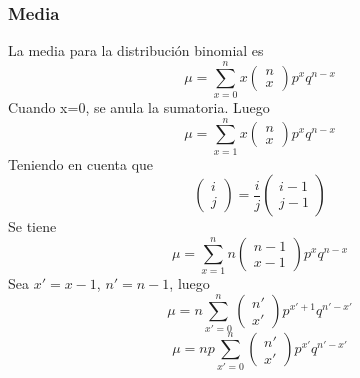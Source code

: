 \documentclass[12pt]{article}
\begin{document}
            \subsubsection{Media}
            	La media para la distribución binomial es	
                \begin{equation*}
                	\mu =\sum _{ x=0 }^{ n }{ x\left( \begin{matrix} n \\ x \end{matrix} \right) { p }^{ x }{ q }^{ n-x } } 
                \end{equation*}
                Cuando x=0, se anula la sumatoria. Luego
                \begin{equation*}
                	\mu =\sum _{ x=1 }^{ n }{ x\left( \begin{matrix} n \\ x \end{matrix} \right) { p }^{ x }{ q }^{ n-x } } 
                \end{equation*}
                Teniendo en cuenta que
                \begin{equation*}
                	\left( \begin{matrix} i \\ j \end{matrix} \right) =\frac { i }{ j } \left( \begin{matrix} i-1 \\ j-1 \end{matrix} \right) 
                \end{equation*}
                Se tiene
                \begin{equation*}
                	\mu =\sum _{ x=1 }^{ n }{ n\left( \begin{matrix} n-1 \\ x-1 \end{matrix} \right) { p }^{ x }{ q }^{ n-x } }
                \end{equation*}
                Sea $x'=x-1$, $n'=n-1$, luego
                \begin{equation*}
                	\mu =n\sum _{ x'=0 }^{ n }{ \left( \begin{matrix} n' \\ x' \end{matrix} \right) { p }^{ x'+1 }{ q }^{ n'-x' } }
                \end{equation*}
				\begin{equation*}
                	\mu =np\sum _{ x'=0 }^{ n }{ \left( \begin{matrix} n' \\ x' \end{matrix} \right) { p }^{ x' }{ q }^{ n'-x' } }
                \end{equation*}
\end{document}
